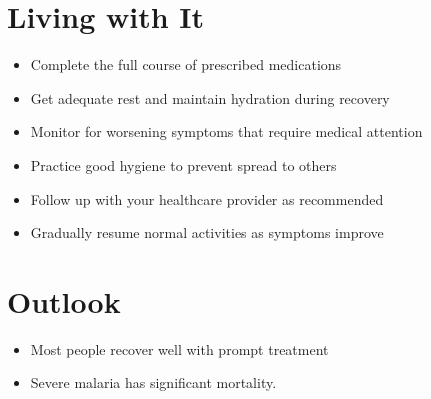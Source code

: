 \section{Living with It}
\begin{itemize}[noitemsep]
  \item Complete the full course of prescribed medications
  \item Get adequate rest and maintain hydration during recovery
  \item Monitor for worsening symptoms that require medical attention
  \item Practice good hygiene to prevent spread to others
  \item Follow up with your healthcare provider as recommended
  \item Gradually resume normal activities as symptoms improve
\end{itemize}
\section{Outlook}
\begin{itemize}[noitemsep]
  \item Most people recover well with prompt treatment
  \item Severe malaria has significant mortality.
\end{itemize}
